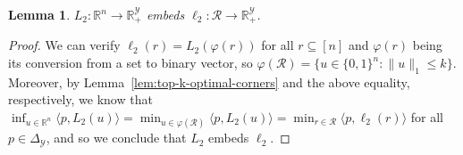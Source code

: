 \documentclass[12pt]{article}
\newcommand{\reals}{\mathbb{R}}
\newcommand{\simplex}{\Delta_\Y}
\newcommand{\R}{\mathcal{R}}
\newcommand{\Y}{\mathcal{Y}}
\newcommand{\inprod}[2]{\langle #1, #2 \rangle}%
\newtheorem{lemma}{Lemma}
\begin{document}
\begin{lemma}\label{lem:top-k-surrogate-embeds}
$L_2:\reals^n \to \reals^\Y_+$ embeds $\ell_2:\R \to \reals^\Y_+$.
\end{lemma}
\begin{proof}
  We can verify $\ell_2(r) = L_2(\varphi(r))$ for all $r \subseteq [n]$ and $\varphi(r)$ being its conversion from a set to binary vector, so $\varphi(\R) = \{ u \in \{0,1\}^n : \|u\|_1 \leq k \}$.
  Moreover, by Lemma~\ref{lem:top-k-optimal-corners} and the above equality, respectively, we know that $\inf_{u \in \reals^n} \inprod{p}{L_2(u)} = \min_{u \in \varphi(\R)} \inprod{p}{L_2(u)} = \min_{r \in \R}\inprod{p}{\ell_2(r)}$ for all $p \in \simplex$, and so we conclude that $L_2$ embeds $\ell_2$.
\end{proof}
\end{document}
